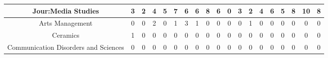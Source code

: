 \documentclass[10pt]{article}
\begin{document}
\begin{landscape}
\begin{longtable}[c]{|ccccccccccccccccccc|}
	\multicolumn{1}{|c|}{Jour:Media Studies}                         & \multicolumn{1}{c|}{3}          & \multicolumn{1}{c|}{2}          & \multicolumn{1}{c|}{4}          & \multicolumn{1}{c|}{5}          & \multicolumn{1}{c|}{7}          & \multicolumn{1}{c|}{6}          & \multicolumn{1}{c|}{6}          & \multicolumn{1}{c|}{8}          & \multicolumn{1}{c|}{6}          & \multicolumn{1}{c|}{0}          & \multicolumn{1}{c|}{3}          & \multicolumn{1}{c|}{2}          & \multicolumn{1}{c|}{4}          & \multicolumn{1}{c|}{6}          & \multicolumn{1}{c|}{5}          & \multicolumn{1}{c|}{8}          & \multicolumn{1}{c|}{10}         & 8          \\ \hline
	\multicolumn{1}{|c|}{Arts Management}                            & \multicolumn{1}{c|}{0}          & \multicolumn{1}{c|}{0}          & \multicolumn{1}{c|}{2}          & \multicolumn{1}{c|}{0}          & \multicolumn{1}{c|}{1}          & \multicolumn{1}{c|}{3}          & \multicolumn{1}{c|}{1}          & \multicolumn{1}{c|}{0}          & \multicolumn{1}{c|}{0}          & \multicolumn{1}{c|}{0}          & \multicolumn{1}{c|}{0}          & \multicolumn{1}{c|}{1}          & \multicolumn{1}{c|}{0}          & \multicolumn{1}{c|}{0}          & \multicolumn{1}{c|}{0}          & \multicolumn{1}{c|}{0}          & \multicolumn{1}{c|}{0}          & 0          \\ \hline
	\multicolumn{1}{|c|}{Ceramics}                                   & \multicolumn{1}{c|}{1}          & \multicolumn{1}{c|}{0}          & \multicolumn{1}{c|}{0}          & \multicolumn{1}{c|}{0}          & \multicolumn{1}{c|}{0}          & \multicolumn{1}{c|}{0}          & \multicolumn{1}{c|}{0}          & \multicolumn{1}{c|}{0}          & \multicolumn{1}{c|}{0}          & \multicolumn{1}{c|}{0}          & \multicolumn{1}{c|}{0}          & \multicolumn{1}{c|}{0}          & \multicolumn{1}{c|}{0}          & \multicolumn{1}{c|}{0}          & \multicolumn{1}{c|}{0}          & \multicolumn{1}{c|}{0}          & \multicolumn{1}{c|}{0}          & 0          \\ \hline
	\multicolumn{1}{|c|}{Communication Disorders and Sciences}       & \multicolumn{1}{c|}{0}          & \multicolumn{1}{c|}{0}          & \multicolumn{1}{c|}{0}          & \multicolumn{1}{c|}{0}          & \multicolumn{1}{c|}{0}          & \multicolumn{1}{c|}{0}          & \multicolumn{1}{c|}{0}          & \multicolumn{1}{c|}{0}          & \multicolumn{1}{c|}{0}          & \multicolumn{1}{c|}{0}          & \multicolumn{1}{c|}{0}          & \multicolumn{1}{c|}{0}          & \multicolumn{1}{c|}{0}          & \multicolumn{1}{c|}{0}          & \multicolumn{1}{c|}{0}          & \multicolumn{1}{c|}{0}          & \multicolumn{1}{c|}{0}          & 0          \\ \hline

\end{longtable}
\end{landscape}
\end{document}
